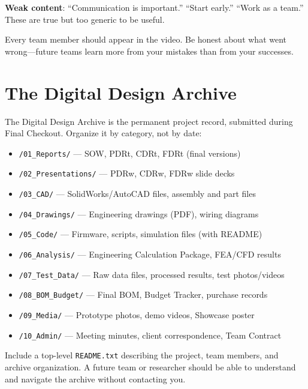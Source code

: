 \textbf{Weak content}: ``Communication is important.'' ``Start early.'' ``Work as a team.'' These are true but too generic to be useful.

Every team member should appear in the video. Be honest about what went wrong---future teams learn more from your mistakes than from your successes.

\section{The Digital Design Archive}
The Digital Design Archive is the permanent project record, submitted during Final Checkout. Organize it by category, not by date:

\begin{itemize}[nosep,leftmargin=1.5em]
\item \texttt{/01\_Reports/} --- SOW, PDRt, CDRt, FDRt (final versions)
\item \texttt{/02\_Presentations/} --- PDRw, CDRw, FDRw slide decks
\item \texttt{/03\_CAD/} --- SolidWorks/AutoCAD files, assembly and part files
\item \texttt{/04\_Drawings/} --- Engineering drawings (PDF), wiring diagrams
\item \texttt{/05\_Code/} --- Firmware, scripts, simulation files (with README)
\item \texttt{/06\_Analysis/} --- Engineering Calculation Package, FEA/CFD results
\item \texttt{/07\_Test\_Data/} --- Raw data files, processed results, test photos/videos
\item \texttt{/08\_BOM\_Budget/} --- Final BOM, Budget Tracker, purchase records
\item \texttt{/09\_Media/} --- Prototype photos, demo videos, Showcase poster
\item \texttt{/10\_Admin/} --- Meeting minutes, client correspondence, Team Contract
\end{itemize}

Include a top-level \texttt{README.txt} describing the project, team members, and archive organization. A future team or researcher should be able to understand and navigate the archive without contacting you.




